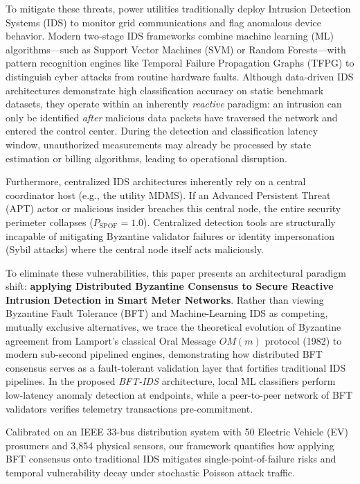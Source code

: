 \documentclass[10pt,twocolumn,journal]{IEEEtran}
\begin{document}
To mitigate these threats, power utilities traditionally deploy Intrusion Detection Systems (IDS) to monitor grid communications and flag anomalous device behavior. Modern two-stage IDS frameworks combine machine learning (ML) algorithms---such as Support Vector Machines (SVM) or Random Forests---with pattern recognition engines like Temporal Failure Propagation Graphs (TFPG) to distinguish cyber attacks from routine hardware faults. Although data-driven IDS architectures demonstrate high classification accuracy on static benchmark datasets, they operate within an inherently \emph{reactive} paradigm: an intrusion can only be identified \emph{after} malicious data packets have traversed the network and entered the control center. During the detection and classification latency window, unauthorized measurements may already be processed by state estimation or billing algorithms, leading to operational disruption.

Furthermore, centralized IDS architectures inherently rely on a central coordinator host (e.g., the utility MDMS). If an Advanced Persistent Threat (APT) actor or malicious insider breaches this central node, the entire security perimeter collapses ($P_{\text{SPOF}} = 1.0$). Centralized detection tools are structurally incapable of mitigating Byzantine validator failures or identity impersonation (Sybil attacks) where the central node itself acts maliciously.

To eliminate these vulnerabilities, this paper presents an architectural paradigm shift: \textbf{applying Distributed Byzantine Consensus to Secure Reactive Intrusion Detection in Smart Meter Networks}. Rather than viewing Byzantine Fault Tolerance (BFT) and Machine-Learning IDS as competing, mutually exclusive alternatives, we trace the theoretical evolution of Byzantine agreement from Lamport's classical Oral Message $OM(m)$ protocol (1982) to modern sub-second pipelined engines, demonstrating how distributed BFT consensus serves as a fault-tolerant validation layer that fortifies traditional IDS pipelines. In the proposed \emph{BFT-IDS} architecture, local ML classifiers perform low-latency anomaly detection at endpoints, while a peer-to-peer network of BFT validators verifies telemetry transactions pre-commitment.

Calibrated on an IEEE 33-bus distribution system with 50 Electric Vehicle (EV) prosumers and 3,854 physical sensors, our framework quantifies how applying BFT consensus onto traditional IDS mitigates single-point-of-failure risks and temporal vulnerability decay under stochastic Poisson attack traffic.
\end{document}
